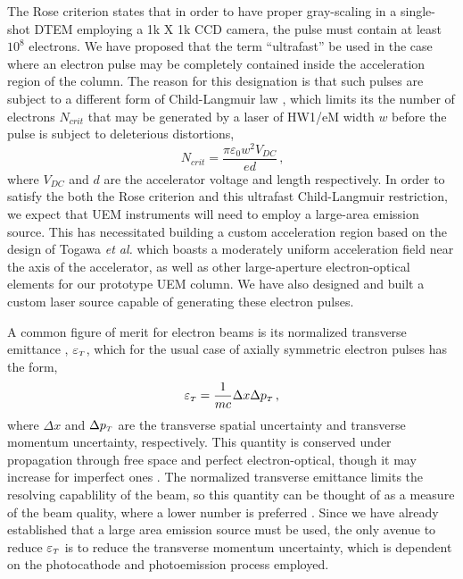 The Rose criterion \cite{rose_television_1948} states that in order to have proper gray-scaling in a single-shot DTEM employing a 1k X 1k CCD camera, the pulse must contain at least $10^8$ electrons.
We have proposed that the term ``ultrafast'' be used in the case where an electron pulse may be completely contained inside the acceleration region of the column.
The reason for this designation is that such pulses are subject to a different form of Child-Langmuir law \cite{child_discharge_1911,langmuir_effect_1923,valfells_effects_2002}, which limits its the number of electrons $N_{crit}$ that may be generated by a laser of HW1/eM width $w$ before the pulse is subject to deleterious distortions,
\begin{equation}
  N_{crit} = \frac{\pi \varepsilon_0 w^2 V_{DC}}{e d} \,\text{,}
\end{equation}
where $V_{DC}$ and $d$ are the accelerator voltage and length respectively.
In order to satisfy the both the Rose criterion and this ultrafast Child-Langmuir restriction, we expect that UEM instruments will need to employ a large-area emission source.
This has necessitated building a custom acceleration region based on the design of Togawa \textit{et al.} \cite{togawa_ceb6_2007} which boasts a moderately uniform acceleration field near the axis of the accelerator, as well as other large-aperture electron-optical elements for our prototype UEM column.
We have also designed and built a custom laser source capable of generating these electron pulses.

A common figure of merit for electron beams is its normalized transverse emittance \cite{jensen_emittance_2010}, $\varepsilon_{{\scriptscriptstyle T}}$, which for the usual case of axially symmetric electron pulses has the form,
\begin{equation}
  \varepsilon_{{\scriptscriptstyle T}} = \frac{1}{m c} \Delta x \Delta p_{{\scriptscriptstyle T}} \,\text{,}
\end{equation}
where $\Delta x$ and $\Delta p_{{\scriptscriptstyle T}}$ are the transverse spatial uncertainty and transverse momentum uncertainty, respectively.
This quantity is conserved under propagation through free space and perfect electron-optical, though it may increase for imperfect ones \cite{oshea_reversible_1998}.
The normalized transverse emittance limits the resolving capablility of the beam, so this quantity can be thought of as a measure of the beam quality, where a lower number is preferred \cite{berger_dc_2009}.
Since we have already established that a large area emission source must be used, the only avenue to reduce $\varepsilon_{{\scriptscriptstyle T}}$ is to reduce the transverse momentum uncertainty, which is dependent on the photocathode and photoemission process employed.

